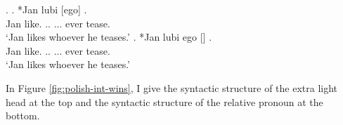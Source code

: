 \ex.\label{ex:polish-acc-dat-rep}
\ag. *Jan lubi [ego]   .\\
Jan like.\scsub{[acc]} .. ... ever tease.\scsub{[dat]}\\
`Jan likes whoever he teases.' \label{ex:polish-acc-dat-rel}
\bg. *Jan lubi ego []  .\\
Jan like.\scsub{[acc]} .. ... ever tease.\scsub{[dat]}\\
`Jan likes whoever he teases.' \label{ex:polish-acc-dat-lh}

In Figure \ref{fig:polish-int-wins}, I give the syntactic structure of the extra light head at the top and the syntactic structure of the relative pronoun at the bottom.


